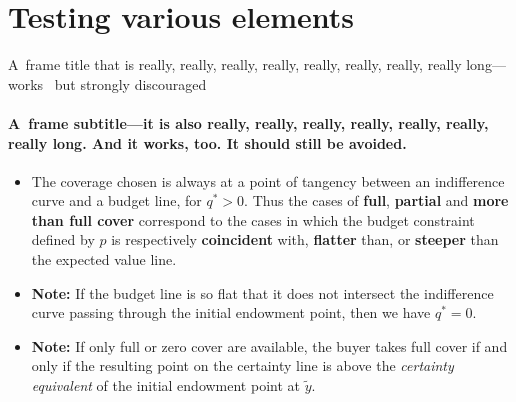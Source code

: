 \documentclass[aspectratio = 169, t, 10pt]{beamer}
\begin{document}
\section{Testing various elements}


\begin{frame}{A~frame title that is really, really, really, really, really, really, really, really long---works \textellipsis\ but strongly discouraged}
\framesubtitle{A~frame subtitle---it is also really, really, really, really, really, really, really long. And it works, too. It should still be avoided.}

\begin{itemize}
	\item The coverage chosen is always at a point of tangency between an indifference curve and a budget line, for ${q^* > 0}$. Thus the cases of \textbf{full}, \textbf{partial} and \textbf{more than full cover} correspond to the cases in which the budget constraint defined by $p$ is respectively \textbf{coincident} with, \textbf{flatter} than, or \textbf{steeper} than the expected value line.
	\item \textbf{Note:} If the budget line is so flat that it does not intersect the indifference curve passing through the initial endowment point, then we have ${q^*= 0}$.
	\item \textbf{Note:} If only full or zero cover are available, the buyer takes full cover if and only if the resulting point on the certainty line is above the \textit{certainty equivalent} of the initial endowment point at $\tilde{y}$.
\end{itemize}

\end{frame}
\end{document}
